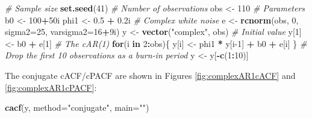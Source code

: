 \documentclass[
]{book}
\newenvironment{Shaded}{\begin{snugshade}}{\end{snugshade}}
\newcommand{\CommentTok}[1]{\textcolor[rgb]{0.56,0.35,0.01}{\textit{#1}}}
\newcommand{\ControlFlowTok}[1]{\textcolor[rgb]{0.13,0.29,0.53}{\textbf{#1}}}
\newcommand{\DataTypeTok}[1]{\textcolor[rgb]{0.13,0.29,0.53}{#1}}
\newcommand{\DecValTok}[1]{\textcolor[rgb]{0.00,0.00,0.81}{#1}}
\newcommand{\FloatTok}[1]{\textcolor[rgb]{0.00,0.00,0.81}{#1}}
\newcommand{\KeywordTok}[1]{\textcolor[rgb]{0.13,0.29,0.53}{\textbf{#1}}}
\newcommand{\NormalTok}[1]{#1}
\newcommand{\OperatorTok}[1]{\textcolor[rgb]{0.81,0.36,0.00}{\textbf{#1}}}
\newcommand{\StringTok}[1]{\textcolor[rgb]{0.31,0.60,0.02}{#1}}
\begin{document}
\begin{Shaded}
\begin{Highlighting}[]
\CommentTok{\# Sample size}
\KeywordTok{set.seed}\NormalTok{(}\DecValTok{41}\NormalTok{)}
\CommentTok{\# Number of observations}
\NormalTok{obs \textless{}{-}}\StringTok{ }\DecValTok{110}
\CommentTok{\# Parameters}
\NormalTok{b0 \textless{}{-}}\StringTok{ }\DecValTok{100}\OperatorTok{+}\NormalTok{50i}
\NormalTok{phi1 \textless{}{-}}\StringTok{ }\FloatTok{0.5} \OperatorTok{+}\StringTok{ }\FloatTok{0.2}\NormalTok{i}
\CommentTok{\# Complex white noise}
\NormalTok{e \textless{}{-}}\StringTok{ }\KeywordTok{rcnorm}\NormalTok{(obs, }\DecValTok{0}\NormalTok{, }\DataTypeTok{sigma2=}\DecValTok{25}\NormalTok{, }\DataTypeTok{varsigma2=}\DecValTok{16}\OperatorTok{+}\NormalTok{9i)}
\NormalTok{y \textless{}{-}}\StringTok{ }\KeywordTok{vector}\NormalTok{(}\StringTok{"complex"}\NormalTok{, obs)}
\CommentTok{\# Initial value}
\NormalTok{y[}\DecValTok{1}\NormalTok{] \textless{}{-}}\StringTok{ }\NormalTok{b0 }\OperatorTok{+}\StringTok{ }\NormalTok{e[}\DecValTok{1}\NormalTok{]}
\CommentTok{\# The cAR(1)}
\ControlFlowTok{for}\NormalTok{(i }\ControlFlowTok{in} \DecValTok{2}\OperatorTok{:}\NormalTok{obs)\{}
\NormalTok{    y[i] \textless{}{-}}\StringTok{ }\NormalTok{phi1 }\OperatorTok{*}\StringTok{ }\NormalTok{y[i}\DecValTok{{-}1}\NormalTok{] }\OperatorTok{+}\StringTok{ }\NormalTok{b0 }\OperatorTok{+}\StringTok{ }\NormalTok{e[i]}
\NormalTok{\}}
\CommentTok{\# Drop the first 10 observations as a burn{-}in period}
\NormalTok{y \textless{}{-}}\StringTok{ }\NormalTok{y[}\OperatorTok{{-}}\KeywordTok{c}\NormalTok{(}\DecValTok{1}\OperatorTok{:}\DecValTok{10}\NormalTok{)]}
\end{Highlighting}
\end{Shaded}

The conjugate cACF/cPACF are shown in Figures \ref{fig:complexAR1cACF} and \ref{fig:complexAR1cPACF}:

\begin{Shaded}
\begin{Highlighting}[]
\KeywordTok{cacf}\NormalTok{(y, }\DataTypeTok{method=}\StringTok{"conjugate"}\NormalTok{, }\DataTypeTok{main=}\StringTok{""}\NormalTok{)}
\end{Highlighting}
\end{Shaded}
\end{document}
